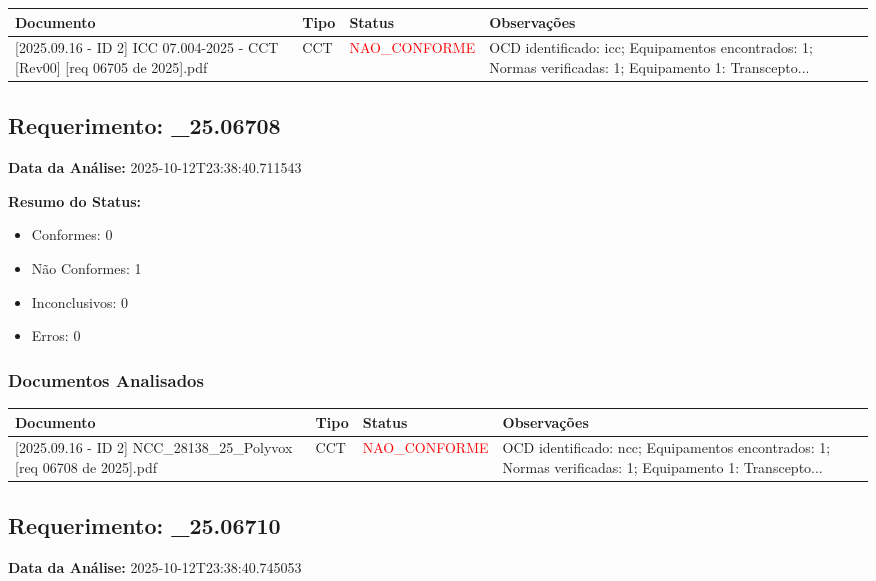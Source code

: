 \documentclass[12pt,a4paper]{article}
\begin{document}
\begin{longtable}{|p{4cm}|p{2cm}|p{2cm}|p{6cm}|}
\hline
\textbf{Documento} & \textbf{Tipo} & \textbf{Status} & \textbf{Observações} \\
\hline
\endhead
[Certificado de Conformidade Técnica - CCT][2025.09.16 - ID 2] ICC 07.004-2025 - CCT [Rev00] [req 06705 de 2025].pdf & CCT & \textcolor{red}{NAO\_CONFORME} & OCD identificado: icc; Equipamentos encontrados: 1; Normas verificadas: 1; Equipamento 1: Transcepto... \\
\hline
\end{longtable}


\subsection{Requerimento: \_25.06708}

\textbf{Data da Análise:} 2025-10-12T23:38:40.711543

\textbf{Resumo do Status:}
\begin{itemize}
    \item Conformes: 0
    \item Não Conformes: 1
    \item Inconclusivos: 0
    \item Erros: 0
\end{itemize}

\subsubsection{Documentos Analisados}

\begin{longtable}{|p{4cm}|p{2cm}|p{2cm}|p{6cm}|}
\hline
\textbf{Documento} & \textbf{Tipo} & \textbf{Status} & \textbf{Observações} \\
\hline
\endhead
[Certificado de Conformidade Técnica - CCT][2025.09.16 - ID 2] NCC\_28138\_25\_Polyvox [req 06708 de 2025].pdf & CCT & \textcolor{red}{NAO\_CONFORME} & OCD identificado: ncc; Equipamentos encontrados: 1; Normas verificadas: 1; Equipamento 1: Transcepto... \\
\hline
\end{longtable}


\subsection{Requerimento: \_25.06710}

\textbf{Data da Análise:} 2025-10-12T23:38:40.745053
\end{document}
